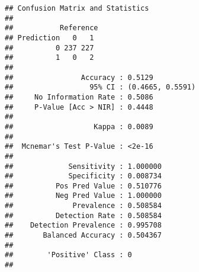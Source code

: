 \documentclass[
]{article}
\newenvironment{Shaded}{\begin{snugshade}}{\end{snugshade}}
\newcommand{\AttributeTok}[1]{\textcolor[rgb]{0.13,0.29,0.53}{#1}}
\newcommand{\DecValTok}[1]{\textcolor[rgb]{0.00,0.00,0.81}{#1}}
\newcommand{\FloatTok}[1]{\textcolor[rgb]{0.00,0.00,0.81}{#1}}
\newcommand{\FunctionTok}[1]{\textcolor[rgb]{0.13,0.29,0.53}{\textbf{#1}}}
\newcommand{\NormalTok}[1]{#1}
\newcommand{\OtherTok}[1]{\textcolor[rgb]{0.56,0.35,0.01}{#1}}
\newcommand{\SpecialCharTok}[1]{\textcolor[rgb]{0.81,0.36,0.00}{\textbf{#1}}}
\newcommand{\StringTok}[1]{\textcolor[rgb]{0.31,0.60,0.02}{#1}}
\begin{document}
\begin{Shaded}
\end{Shaded}

\begin{verbatim}
## Confusion Matrix and Statistics
## 
##           Reference
## Prediction   0   1
##          0 237 227
##          1   0   2
##                                           
##                Accuracy : 0.5129          
##                  95% CI : (0.4665, 0.5591)
##     No Information Rate : 0.5086          
##     P-Value [Acc > NIR] : 0.4448          
##                                           
##                   Kappa : 0.0089          
##                                           
##  Mcnemar's Test P-Value : <2e-16          
##                                           
##             Sensitivity : 1.000000        
##             Specificity : 0.008734        
##          Pos Pred Value : 0.510776        
##          Neg Pred Value : 1.000000        
##              Prevalence : 0.508584        
##          Detection Rate : 0.508584        
##    Detection Prevalence : 0.995708        
##       Balanced Accuracy : 0.504367        
##                                           
##        'Positive' Class : 0               
## 
\end{verbatim}
\end{document}
